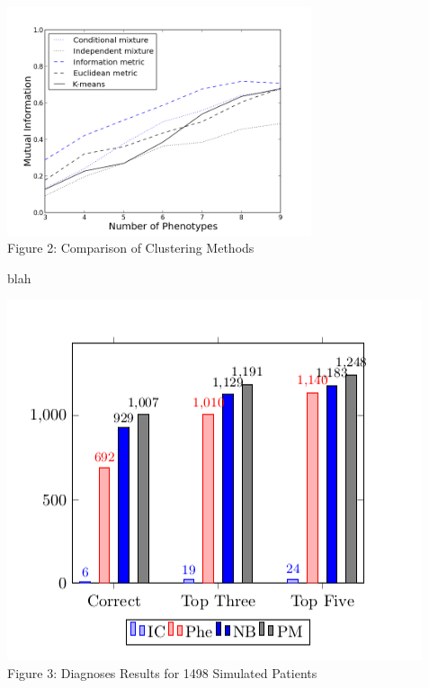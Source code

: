 \documentclass[final]{beamer} %
\begin{document}
\begin{frame}{}
\begin{columns}[T]
\begin{column}{0.3\linewidth}
    \end{column}

    \begin{column}{0.3\linewidth}
    \begin{block}{\Huge }
      \centering
\includegraphics[width=0.7\textwidth]{cluster_comparison.png} \\
   Figure 2: Comparison of Clustering Methods

    \end{block}

    \begin{block}{\large blah}

\centering
\includegraphics[width=.7\textwidth ]{sim_patients}
   \\
   Figure 3: Diagnoses Results for 1498 Simulated Patients
      \end{block}
    \end{column}
    \end{columns}
  \end{frame}
  
\end{document}

